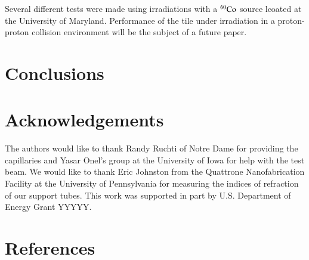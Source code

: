 \documentclass[review]{elsarticle}
\begin{document}
Several different tests were made using irradiations with a $\rm{^{60}Co}$ source lcoated at the University of Maryland.  Performance of the tile under irradiation in a proton-proton collision environment will be the subject of a future paper.

\section{Conclusions}

\section{Acknowledgements}
The authors would like to thank Randy Ruchti of Notre Dame for providing the capillaries and Yasar Onel's group at the University of Iowa for help with the test beam.  We would like to thank Eric Johnston from the Quattrone Nanofabrication Facility  at the University of Pennsylvania for measuring the indices of refraction of our support tubes.
This work was supported in part by U.S. Department of Energy Grant YYYYY.

\section*{References}


\end{document}
